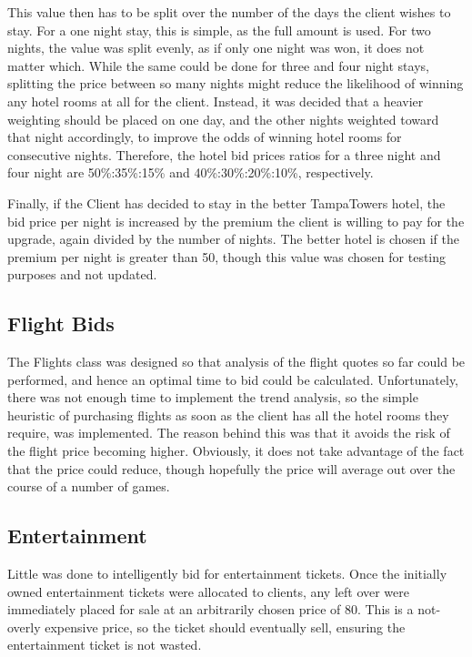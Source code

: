 \documentclass{acm_proc_article-sp}
\begin{document}
  This value then has to be split over the number of the days the client wishes to stay.  For a one night stay, this is simple, as the full amount is used.  For two nights, the value was split evenly, as if only one night was won, it does not matter which.  While the same could be done for three and four night stays, splitting the price between so many nights might reduce the likelihood of winning any hotel rooms at all for the client.  Instead, it was decided that a heavier weighting should be placed on one day, and the other nights weighted toward that night accordingly, to improve the odds of winning hotel rooms for consecutive nights.  Therefore, the hotel bid prices ratios for a three night and four night are 50\%:35\%:15\% and 40\%:30\%:20\%:10\%, respectively.
  
  Finally, if the Client has decided to stay in the better TampaTowers hotel, the bid price per night is increased by the premium the client is willing to pay for the upgrade, again divided by the number of nights.  The better hotel is chosen if the premium per night is greater than 50, though this value was chosen for testing purposes and not updated.
  
 \subsection{Flight Bids}
  The Flights class was designed so that analysis of the flight quotes so far could be performed, and hence an optimal time to bid could be calculated.  Unfortunately, there was not enough time to implement the trend analysis, so the simple heuristic of purchasing flights as soon as the client has all the hotel rooms they require, was implemented.  The reason behind this was that it avoids the risk of the flight price becoming higher.  Obviously, it does not take advantage of the fact that the price could reduce, though hopefully the price will average out over the course of a number of games.
  
 \subsection{Entertainment}
  Little was done to intelligently bid for entertainment tickets.  Once the initially owned entertainment tickets were allocated to clients, any left over were immediately placed for sale at an arbitrarily chosen price of 80.  This is a not-overly expensive price, so the ticket should eventually sell, ensuring the entertainment ticket is not wasted.
  
\end{document}
